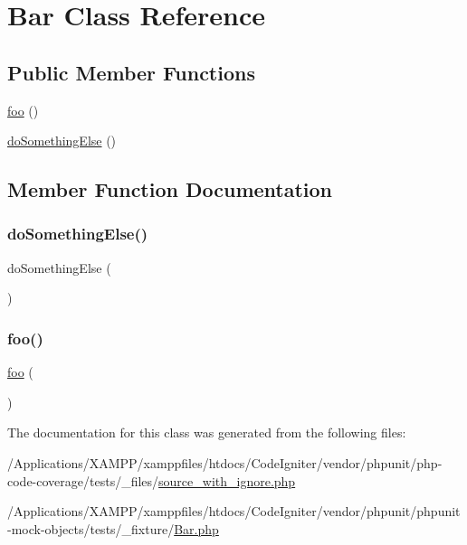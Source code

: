 \hypertarget{class_bar}{}\section{Bar Class Reference}
\label{class_bar}
\subsection*{Public Member Functions}
\begin{DoxyCompactItemize}
\item 
\mbox{\hyperlink{class_bar_a79418a120498dd9cf915655654607747}{foo}} ()
\item 
\mbox{\hyperlink{class_bar_a01b5414a947d9d500c188a27b574d16f}{do\+Something\+Else}} ()
\end{DoxyCompactItemize}


\subsection{Member Function Documentation}
\mbox{\label{class_bar_a01b5414a947d9d500c188a27b574d16f}} 
\subsubsection{\texorpdfstring{do\+Something\+Else()}{doSomethingElse()}}
{\footnotesize\ttfamily do\+Something\+Else (\begin{DoxyParamCaption}{ }\end{DoxyParamCaption})}

\mbox{\label{class_bar_a79418a120498dd9cf915655654607747}} 
\subsubsection{\texorpdfstring{foo()}{foo()}}
{\footnotesize\ttfamily \mbox{\hyperlink{interfacefoo}{foo}} (\begin{DoxyParamCaption}{ }\end{DoxyParamCaption})}



The documentation for this class was generated from the following files\+:\begin{DoxyCompactItemize}
\item 
/\+Applications/\+X\+A\+M\+P\+P/xamppfiles/htdocs/\+Code\+Igniter/vendor/phpunit/php-\/code-\/coverage/tests/\+\_\+files/\mbox{\hyperlink{source__with__ignore_8php}{source\+\_\+with\+\_\+ignore.\+php}}\item 
/\+Applications/\+X\+A\+M\+P\+P/xamppfiles/htdocs/\+Code\+Igniter/vendor/phpunit/phpunit-\/mock-\/objects/tests/\+\_\+fixture/\mbox{\hyperlink{_bar_8php}{Bar.\+php}}\end{DoxyCompactItemize}
